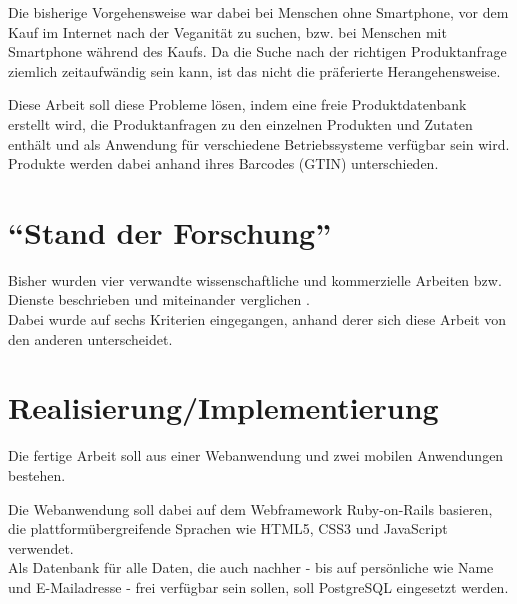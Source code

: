 \documentclass[a4paper,11pt,bibtotoc,headsepline]{scrartcl}
\begin{document}
Die bisherige Vorgehensweise war dabei bei Menschen ohne Smartphone,
vor dem Kauf im Internet nach der Veganität zu suchen, bzw. bei Menschen
mit Smartphone während des Kaufs. Da die Suche nach der richtigen Produktanfrage
ziemlich zeitaufwändig sein kann, ist das nicht die präferierte
Herangehensweise.

Diese Arbeit soll diese Probleme lösen, indem eine freie
Produktdatenbank erstellt wird, die Produktanfragen zu den einzelnen
Produkten und Zutaten enthält und als Anwendung für verschiedene
Betriebssysteme verfügbar sein wird.\\
Produkte werden dabei anhand ihres Barcodes (GTIN) unterschieden.

\section{``Stand der Forschung''} %

Bisher wurden vier verwandte wissenschaftliche und kommerzielle
Arbeiten bzw. Dienste beschrieben und miteinander verglichen
\cite{arfhhm08, bre07, barcoo, did}.\\
Dabei wurde auf sechs Kriterien eingegangen, anhand derer sich diese
Arbeit von den anderen unterscheidet.

\section{Realisierung/Implementierung} %

Die fertige Arbeit soll aus einer Webanwendung und zwei
mobilen Anwendungen bestehen.

Die Webanwendung soll dabei auf dem Webframework Ruby-on-Rails
basieren, die plattformübergreifende Sprachen wie HTML5, CSS3 und
JavaScript verwendet.\\
Als Datenbank für alle Daten, die auch nachher - bis auf persönliche
wie Name und E-Mailadresse - frei
verfügbar sein sollen, soll PostgreSQL eingesetzt werden.
\end{document}
